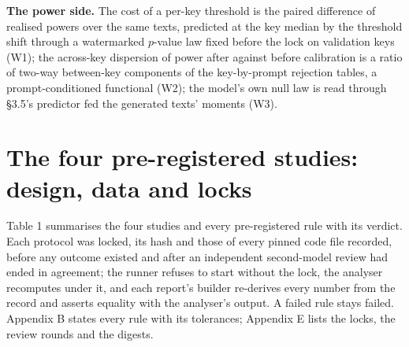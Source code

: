 \documentclass[11pt,letterpaper]{article}
\begin{document}
\textbf{The power side.} The cost of a per-key threshold is the paired difference of realised powers over the same texts, predicted at the key median by the threshold shift through a watermarked \(p\)-value law fixed before the lock on validation keys (W1); the across-key dispersion of power after against before calibration is a ratio of two-way between-key components of the key-by-prompt rejection tables, a prompt-conditioned functional (W2); the model's own null law is read through \S{}3.5's predictor fed the generated texts' moments (W3).

\hypertarget{the-four-pre-registered-studies-design-data-and-locks}{%
\section{The four pre-registered studies: design, data and locks}\label{the-four-pre-registered-studies-design-data-and-locks}}

Table 1 summarises the four studies and every pre-registered rule with its verdict. Each protocol was locked, its hash and those of every pinned code file recorded, before any outcome existed and after an independent second-model review had ended in agreement; the runner refuses to start without the lock, the analyser recomputes under it, and each report's builder re-derives every number from the record and asserts equality with the analyser's output. A failed rule stays failed. Appendix B states every rule with its tolerances; Appendix E lists the locks, the review rounds and the digests.
\end{document}
